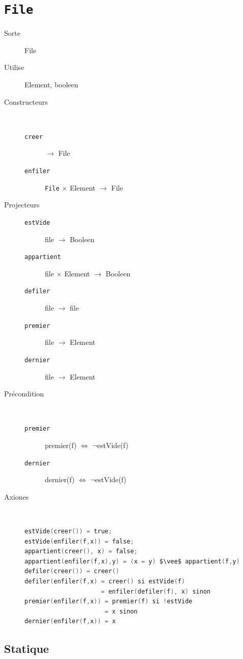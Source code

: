 \section{\texttt{File}}
\begin{description}
	\item[Sorte] File
	\item[Utilise] Element, booleen
	\item[Constructeurs]~
		\begin{description}
			\item[\texttt{creer}] $\rightarrow$ File%
			\item[\texttt{enfiler}] \texttt{File} $\times$ Element $\rightarrow$ File
		\end{description}
	\item[Projecteurs] 
		\begin{description}
			\item[\texttt{estVide}] file $\rightarrow$ Booleen
			\item[\texttt{appartient}] file $\times$ Element $\rightarrow$ Booleen
			\item[\texttt{defiler}] file $\rightarrow$ file
			\item[\texttt{premier}] file $\rightarrow$ Element
			\item[\texttt{dernier}] file $\rightarrow$ Element
		\end{description}
	\item[Précondition]~
		\begin{description}
			\item[\texttt{premier}] premier(f) $\Leftrightarrow$ $\neg$estVide(f) 
			\item[\texttt{dernier}] dernier(f) $\Leftrightarrow$ $\neg$estVide(f) 
		\end{description}
	\item[Axiones]~
		\begin{lstlisting}[language=C, numbers=none,caption=\texttt{File} -- Axiones]
estVide(creer()) = true;
estVide(enfiler(f,x)) = false;
appartient(creer(), x) = false;
appartient(enfiler(f,x),y) = (x = y) $\vee$ appartient(f,y)
defiler(creer()) = creer()
defiler(enfiler(f,x) = creer() si estVide(f)
					 = enfiler(defiler(f), x) sinon
premier(enfiler(f,x)) = premier(f) si !estVide
					  = x sinon
dernier(enfiler(f,x)) = x
\end{lstlisting}
\end{description}
	
	\subsection{Statique}

